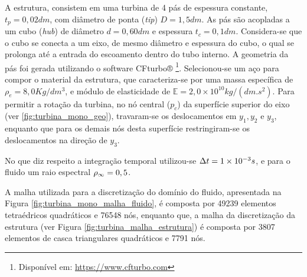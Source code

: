 A estrutura, consistem em uma turbina de 4 pás de espessura constante, $t_p = 0,02dm$, com diâmetro de ponta (\textit{tip}) $D=1,5dm$. As pás são acopladas a um cubo (\textit{hub}) de diâmetro $d=0,60dm$ e espessura $t_c = 0,1dm$. Considera-se que o cubo se conecta a um eixo, de mesmo diâmetro e espessura do cubo, o qual se prolonga até a entrada do escoamento dentro do tubo interno. A geometria da pás foi gerada utilizando o software CFturbo® \footnote{Disponível em: \url{https://www.cfturbo.com}}. Selecionou-se um aço para compor o material da estrutura, que caracteriza-se por uma massa específica de $\rho_{e} =  8,0 Kg/dm^3 $, e módulo de elasticidade de $\mathbb{E} = 2,0\times10^{10} kg/(dm.s^2)$. Para permitir a rotação da turbina, no nó central ($p_c$) da superfície superior do eixo (ver \autoref{fig:turbina_mono_geo}), travaram-se os deslocamentos em $y_1,y_2$ e $y_3$, enquanto que para os demais nós desta superfície restringiram-se os deslocamentos na direção de $y_3$.

No que diz respeito a integração temporal utilizou-se $\Delta t = 1\times10^{-3}s$, e para o fluido um raio espectral $\rho_\infty = 0,5$.

A malha utilizada para a discretização do domínio do fluido, apresentada na Figura \ref{fig:turbina_mono_malha_fluido}, é composta por 49239 elementos tetraédricos quadráticos e 76548 nós, enquanto que, a malha da discretização da estrutura (ver Figura \ref{fig:turbina_malha_estrutura}) é composta por 3807 elementos de casca triangulares quadráticos e 7791 nós.

